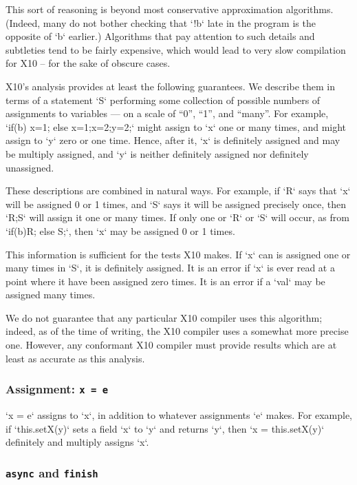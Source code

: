 This sort of reasoning is beyond  most conservative approximation algorithms.
(Indeed, many do not bother checking that \xcd`!b` late in the program is the
opposite of \xcd`b` earlier.)
Algorithms that pay attention to such details and subtleties tend to be
fairly expensive, which would lead to very slow compilation for X10 -- for the
sake of obscure cases.

X10's analysis provides at least the following guarantees. We describe them in
terms of a statement \xcd`S` performing some collection of possible numbers of
assignments to variables --- on a scale of ``0'', ``1'', and ``many''. For
example, \xcd`if(b) x=1; else {x=1;x=2;y=2;}` might assign to \xcd`x` one or
many times, and might assign to \xcd`y` zero or one time. Hence, after it,
\xcd`x` is definitely assigned and may be multiply assigned, and \xcd`y` is
neither definitely assigned nor definitely unassigned.  

These descriptions are combined in natural ways.  For example, if \xcd`R` says
that \xcd`x` will be assigned 0 or 1 times, and \xcd`S` says it will be
assigned precisely once, then \xcd`R;S` will assign it one or many times.  If
only one or \xcd`R` or \xcd`S` will occur, as from \xcd`if(b)R; else S;`, 
then \xcd`x` may be assigned 0 or 1 times. 

This information is sufficient for the tests X10 makes.  If \xcd`x` can is
assigned one or many times in \xcd`S`, it is definitely assigned.  It is an
error if 
\xcd`x` is ever read at a point where it have been assigned zero times.  It is
an error if a \xcd`val` may be assigned many times.


We do not guarantee that any particular X10 compiler uses this algorithm;
indeed, as of the time of writing, the X10 compiler uses a somewhat more
precise one.  However, any conformant X10 compiler must provide results which
are at least as accurate as this analysis.




\subsubsection{Assignment: {\tt x = e}}   

\xcd`x = e` assigns to \xcd`x`, in addition to whatever assignments
\xcd`e` makes.   For example, if \xcd`this.setX(y)` sets a field \xcd`x` to
\xcd`y` and returns \xcd`y`, then \xcd`x = this.setX(y)` definitely and
multiply assigns \xcd`x`.  

\subsubsection{{\tt async} and {\tt finish}}

